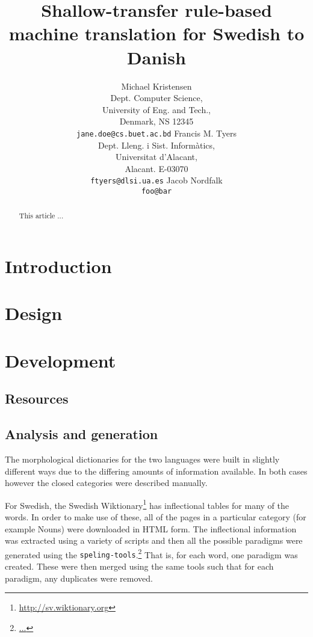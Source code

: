 \documentclass[11pt]{article}
\title{Shallow-transfer rule-based machine translation for Swedish to Danish}
\author{Michael Kristensen\\
  Dept. Computer Science, \\
  University of Eng. and Tech.,\\
  Denmark, NS 12345 \\
  {\tt jane.doe@cs.buet.ac.bd} \And
  Francis M. Tyers\\
  Dept. Lleng. i Sist. Informàtics, \\
  Universitat d'Alacant,\\
  Alacant. E-03070\\  
  {\tt ftyers@dlsi.ua.es} \And
  Jacob Nordfalk\\
  {\tt foo@bar}}
\date{}
\begin{document}
\maketitle

\begin{abstract}
  This article ...
\end{abstract}

\section{Introduction}


\section{Design}


\section{Development}

\subsection{Resources}


\subsection{Analysis and generation}


The morphological dictionaries for the two languages were built in slightly 
different ways due to the differing amounts of information available. In both
cases however the closed categories were described manually. 

For Swedish, the Swedish Wiktionary\footnote{\url{http://sv.wiktionary.org}} has
inflectional tables for many of the words. In order to make use of these, all of 
the pages in a particular category (for example Nouns) were downloaded in HTML
form. The inflectional information was extracted using a variety of scripts and 
then all the possible paradigms were generated using the {\tt\small speling-tools}.\footnote{\url{...}}
That is, for each word, one paradigm was created. These were then merged using
the same tools such that for each paradigm, any duplicates were removed. %
\end{document}
